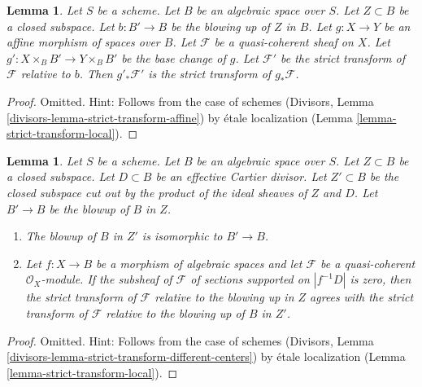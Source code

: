 \documentclass{stacks-project}
\theoremstyle{plain}
\newtheorem{lemma}[subsection]{Lemma}
\theoremstyle{definition}
\theoremstyle{remark}
\numberwithin{equation}{subsection}
\begin{document}
\begin{lemma}
\label{lemma-strict-transform-affine}
Let $S$ be a scheme. Let $B$ be an algebraic space over $S$.
Let $Z \subset B$ be a closed subspace.
Let $b : B' \to B$ be the blowing up of $Z$ in $B$. Let
$g : X \to Y$ be an affine morphism of spaces over $B$.
Let $\mathcal{F}$ be a quasi-coherent sheaf on $X$.
Let $g' : X \times_B B' \to Y \times_B B'$ be the base change
of $g$. Let $\mathcal{F}'$ be the strict transform of $\mathcal{F}$
relative to $b$. Then $g'_*\mathcal{F}'$ is the strict transform
of $g_*\mathcal{F}$.
\end{lemma}

\begin{proof}
Omitted. Hint: Follows from the case of schemes
(Divisors, Lemma \ref{divisors-lemma-strict-transform-affine})
by \'etale localization (Lemma \ref{lemma-strict-transform-local}).
\end{proof}

\begin{lemma}
\label{lemma-strict-transform-different-centers}
Let $S$ be a scheme. Let $B$ be an algebraic space over $S$.
Let $Z \subset B$ be a closed subspace.
Let $D \subset B$ be an effective Cartier divisor.
Let $Z' \subset B$ be the closed subspace cut out by the product
of the ideal sheaves of $Z$ and $D$.
Let $B' \to B$ be the blowup of $B$ in $Z$.
\begin{enumerate}
\item The blowup of $B$ in $Z'$ is isomorphic to $B' \to B$.
\item Let $f : X \to B$ be a morphism of algebraic spaces and let $\mathcal{F}$
be a quasi-coherent $\mathcal{O}_X$-module. If the subsheaf of $\mathcal{F}$ of
sections supported on $|f^{-1}D|$ is zero, then the
strict transform of $\mathcal{F}$ relative to the blowing up
in $Z$ agrees with the strict transform of $\mathcal{F}$ relative
to the blowing up of $B$ in $Z'$.
\end{enumerate}
\end{lemma}

\begin{proof}
Omitted. Hint: Follows from the case of schemes
(Divisors, Lemma \ref{divisors-lemma-strict-transform-different-centers})
by \'etale localization (Lemma \ref{lemma-strict-transform-local}).
\end{proof}
\end{document}

